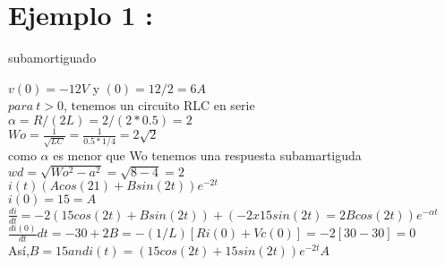 \documentclass[12pt,a4paper]{article}
\begin{document}
\section*{Ejemplo 1 : }
subamortiguado


$v(0) = - 12V$ y $ (0) =12/2=6 A$\vspace{5mm} \\  %
$para \ t >0$, tenemos un circuito RLC en serie\vspace{5mm}\\
$\alpha = R / (2L) = 2 / (2 * 0.5) = 2$\vspace{5mm}\\
$Wo=\frac{1}{\sqrt{LC}} =\frac{1}{0.5*1/4}=2\sqrt{2} $\vspace{5mm}\\
como $\alpha$ es menor que Wo tenemos una respuesta subamartiguda\vspace{5mm}\\
$wd = \sqrt{Wo^ 2 - a^2}  = \sqrt{8 - 4} = 2$\vspace{5mm}\\
$i(t) (Acos(21)+ Bsin(2t))e^{-2t}$\vspace{5mm}\\
$i(0)=15=A$\vspace{5mm}\\
$\frac{di}{dt} = -2(15cos(2t) + Bsin(2t))+(-2x15sin(2t)=2Bcos(2t))e^{-\alpha t}$\vspace{5mm}\\
$\frac{di(0)}{dt} dt=-30+2B=- (1/L) [Ri(0) + Vc(0)] = - 2[30 - 30] = 0$\vspace{5mm}\\
Así,$ B = 15 and i(t)=(15cos(2t)+15sin(2t))e^{-2t}A$\vspace{5mm}\\
\end{document}
